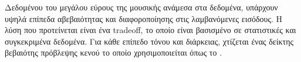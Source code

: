 Δεδομένου του μεγάλου εύρους της μουσικής ανάμεσα στα δεδομένα, υπάρχουν υψηλά
επίπεδα αβεβαιότητας και διαφοροποίησης στις λαμβανόμενες εισόδους. Η λύση που
προτείνεται είναι ένα tradeoff, το οποίο είναι βασισμένο σε στατιστικές και
συγκεκριμένα δεδομένα. Για κάθε επίπεδο τόνου και διάρκειας, χτίζεται ένας
δείκτης βεβαιότης πρόβλεψης κενού το οποίο χρησιμοποιείται όπως το .
\undef{\fp}
\undef{\fps}
